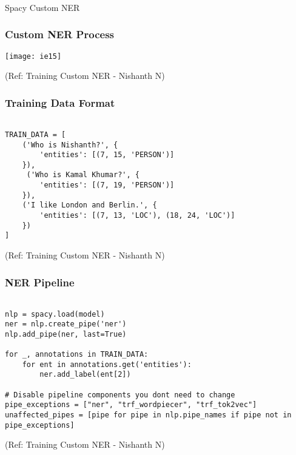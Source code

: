 \begin{frame}[fragile]\frametitle{}

\begin{center}
{\Large Spacy Custom NER}
\end{center}
\end{frame}

\begin{frame}[fragile]\frametitle{Custom NER Process}


\begin{center}
\texttt{[image: ie15]}
\end{center}

{\tiny (Ref: Training Custom NER - Nishanth N)}

\end{frame}

\begin{frame}[fragile]\frametitle{Training Data Format}


\begin{lstlisting}

TRAIN_DATA = [
    ('Who is Nishanth?', {
        'entities': [(7, 15, 'PERSON')]
    }),
     ('Who is Kamal Khumar?', {
        'entities': [(7, 19, 'PERSON')]
    }),
    ('I like London and Berlin.', {
        'entities': [(7, 13, 'LOC'), (18, 24, 'LOC')]
    })
]
\end{lstlisting}

{\tiny (Ref: Training Custom NER - Nishanth N)}

\end{frame}

\begin{frame}[fragile]\frametitle{NER Pipeline}


\begin{lstlisting}

nlp = spacy.load(model)  
ner = nlp.create_pipe('ner')
nlp.add_pipe(ner, last=True)

for _, annotations in TRAIN_DATA:
    for ent in annotations.get('entities'):
        ner.add_label(ent[2])
				
# Disable pipeline components you dont need to change
pipe_exceptions = ["ner", "trf_wordpiecer", "trf_tok2vec"]
unaffected_pipes = [pipe for pipe in nlp.pipe_names if pipe not in pipe_exceptions]

\end{lstlisting}

{\tiny (Ref: Training Custom NER - Nishanth N)}

\end{frame}

